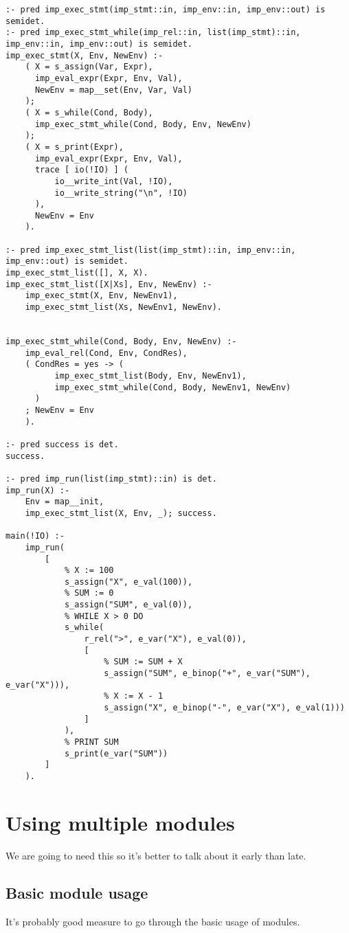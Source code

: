 \begin{lstlisting}[language=Mercury]
:- pred imp_exec_stmt(imp_stmt::in, imp_env::in, imp_env::out) is semidet.
:- pred imp_exec_stmt_while(imp_rel::in, list(imp_stmt)::in, imp_env::in, imp_env::out) is semidet.
imp_exec_stmt(X, Env, NewEnv) :-
	( X = s_assign(Var, Expr),
	  imp_eval_expr(Expr, Env, Val),
	  NewEnv = map__set(Env, Var, Val)
	);
	( X = s_while(Cond, Body),
	  imp_exec_stmt_while(Cond, Body, Env, NewEnv)
	);
	( X = s_print(Expr),
	  imp_eval_expr(Expr, Env, Val),
	  trace [ io(!IO) ] (
		  io__write_int(Val, !IO),
		  io__write_string("\n", !IO)
	  ),
	  NewEnv = Env
	).

:- pred imp_exec_stmt_list(list(imp_stmt)::in, imp_env::in, imp_env::out) is semidet.
imp_exec_stmt_list([], X, X).
imp_exec_stmt_list([X|Xs], Env, NewEnv) :-
	imp_exec_stmt(X, Env, NewEnv1),
	imp_exec_stmt_list(Xs, NewEnv1, NewEnv).


imp_exec_stmt_while(Cond, Body, Env, NewEnv) :-
	imp_eval_rel(Cond, Env, CondRes),
	( CondRes = yes -> (
		  imp_exec_stmt_list(Body, Env, NewEnv1),
		  imp_exec_stmt_while(Cond, Body, NewEnv1, NewEnv)
	  )
	; NewEnv = Env
	).

:- pred success is det.
success.

:- pred imp_run(list(imp_stmt)::in) is det.
imp_run(X) :-
	Env = map__init,
	imp_exec_stmt_list(X, Env, _); success.
	
main(!IO) :-
	imp_run(
		[
            % X := 100
			s_assign("X", e_val(100)),
            % SUM := 0
			s_assign("SUM", e_val(0)),
            % WHILE X > 0 DO
			s_while(
				r_rel(">", e_var("X"), e_val(0)),
				[
                    % SUM := SUM + X
					s_assign("SUM", e_binop("+", e_var("SUM"), e_var("X"))),
                    % X := X - 1
					s_assign("X", e_binop("-", e_var("X"), e_val(1)))
				]
			),
            % PRINT SUM
			s_print(e_var("SUM"))
		]
	).
\end{lstlisting}

\section{Using multiple modules}

We are going to need this so it's better to talk about it early than late.

\subsection{Basic module usage}

It's probably good measure to go through the basic usage of modules.

